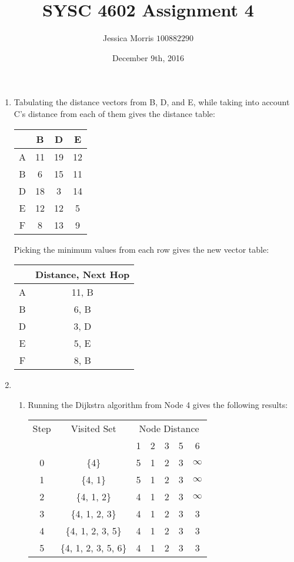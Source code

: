 \documentclass{article}
\title{SYSC 4602 Assignment 4}
\date{December 9th, 2016}
\author{Jessica Morris \(100882290\)}
\begin{document}
\maketitle

\begin{enumerate}

\item Tabulating the distance vectors from B, D, and E, while taking into account C's distance from each of them gives the distance table:

\begin{center}
\begin{tabular}{ c|c|c|c }
    & B & D & E \\
    \hline
    A & 11 & 19 & 12 \\ \hline
    B & 6 & 15 & 11 \\ \hline
    D & 18 & 3 & 14 \\ \hline
    E & 12 & 12 & 5 \\ \hline
    F & 8 & 13 & 9 \\ \hline
\end{tabular}
\end{center}

Picking the minimum values from each row gives the new vector table:
\begin{center}
\begin{tabular}{ c|c }
    & Distance, Next Hop \\
    \hline
    A & 11, B \\ \hline
    B & 6, B \\ \hline
    D & 3, D \\ \hline
    E & 5, E \\ \hline
    F & 8, B \\ \hline
\end{tabular}
\end{center}

\item
\begin{enumerate}

\item Running the Dijkstra algorithm from Node 4 gives the following results:
\begin{center}
\begin{tabular}{ |c|c|c|c|c|c|c| }
    Step & Visited Set &  \multicolumn{5}{c|}{Node Distance} \\
     & & 1 & 2 & 3 & 5 & 6 \\
    \hline
    0 & \{4\} & 5 & 1 & 2 & 3 & $\infty$ \\ \hline
    1 & \{4, 1\} & 5 & 1 & 2 & 3 & $\infty$ \\ \hline
    2 & \{4, 1, 2\} & 4 & 1 & 2 & 3 & $\infty$ \\ \hline
    3 & \{4, 1, 2, 3\} & 4 & 1 & 2 & 3 & 3 \\ \hline
    4 & \{4, 1, 2, 3, 5\} & 4 & 1 & 2 & 3 & 3 \\ \hline
    5& \{4, 1, 2, 3, 5, 6\} & 4 & 1 & 2 & 3 & 3 \\ \hline
\end{tabular}
\end{center}


\end{enumerate}
\end{enumerate}
\end{document}
